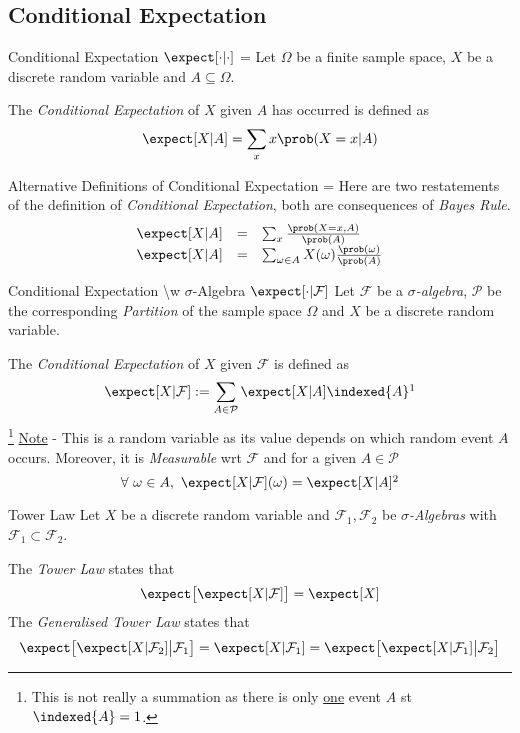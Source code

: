 \documentclass[11pt,a4paper]{article}
\begin{document}
\subsection{Conditional Expectation}

  \begin{definition}{Conditional Expectation $\expect[\cdot|\cdot]$}
    \everymath={\displaystyle}
    Let $\Omega$ be a finite sample space, $X$ be a discrete random variable and $A\subseteq\Omega$.
    \par The \textit{Conditional Expectation} of $X$ given $A$ has occurred is defined as
    \[ \expect[X|A]=\sum_xx\prob(X=x|A) \]
  \end{definition}

  \begin{remark}{Alternative Definitions of Conditional Expectation}
    \everymath={\displaystyle}
    Here are two restatements of the definition of \textit{Conditional Expectation}, both are consequences of \textit{Bayes Rule}.
    \[\begin{array}{rcl}
      \expect[X|A]&=&\sum_x\frac{\prob(X=x,A)}{\prob(A)}\\
      \expect[X|A]&=&\sum_{\omega\in A}X(\omega)\frac{\prob(\omega)}{\prob(A)}
    \end{array}\]
  \end{remark}

  \begin{definition}{Conditional Expectation \textbackslash{w} $\sigma$-Algebra $\expect[\cdot|\mathcal{F}]$}
    Let $\mathcal{F}$ be a \textit{$\sigma$-algebra}, $\mathcal{P}$ be the corresponding \textit{Partition} of the sample space $\Omega$ and $X$ be a discrete random variable.
    \par The \textit{Conditional Expectation} of $X$ given $\mathcal{F}$ is defined as
    \[ \expect[X|\mathcal{F}]:=\sum_{A\in\mathcal{P}}\expect[X|A]\indexed\{A\}\footnotemark \]
    \footnote{This is not really a summation as there is only \underline{one} event $A$ st $\indexed\{A\}=1$.}
    \underline{Note} - This is a random variable as its value depends on which random event $A$ occurs. Moreover, it is \textit{Measurable} wrt $\mathcal{F}$ and for a given $A\in\mathcal{P}$
    \[ \forall\ \omega\in A,\ \expect[X|\mathcal{F}](\omega)=\expect[X|A]\footnotemark \]
  \end{definition}

  \begin{theorem}{Tower Law}\label{the_tower_law}
    Let $X$ be a discrete random variable and $\mathcal{F}_1,\mathcal{F}_2$ be \textit{$\sigma$-Algebras} with $\mathcal{F}_1\subset\mathcal{F}_2$.
    \par The \textit{Tower Law} states that
    \[ \expect\big[\expect[X|\mathcal{F}]\big]=\expect[X] \]
    The \textit{Generalised Tower Law} states that
    \[ \expect\big[\expect[X|\mathcal{F}_2]\big|\mathcal{F}_1\big] = \expect[X|\mathcal{F}_1] = \expect\big[\expect[X|\mathcal{F}_1]\big|\mathcal{F}_2\big] \]
  \end{theorem}
\end{document}
